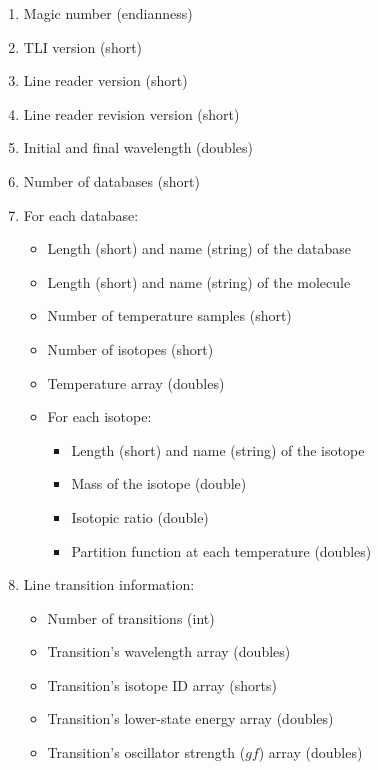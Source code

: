 \documentclass[letterpaper, 12pt]{article}
\begin{document}
\begin{enumerate}
\setlength\itemsep{0ex}
\setlength\topsep{0ex}
\setlength\partopsep{0ex}
\setlength\parsep{0ex}

\item Magic number (endianness)
\item TLI version (short)
\item Line reader version (short)
\item Line reader revision version (short)
\item Initial and final wavelength (doubles)
\item Number of databases (short)
\item For each database:

\begin{itemize}
\setlength\itemsep{0ex}
\setlength\topsep{0ex}
\setlength\partopsep{0ex}
\setlength\parsep{0ex}
\item Length (short) and name (string) of the database
\item Length (short) and name (string) of the molecule
\item Number of temperature samples (short)
\item Number of isotopes (short)
\item Temperature array (doubles)

\item For each isotope:
\begin{itemize}
\setlength\itemsep{0ex}
\setlength\topsep{0ex}
\setlength\partopsep{0ex}
\setlength\parsep{0ex}
\item Length (short) and name (string) of the isotope
\item Mass of the isotope (double)
\item Isotopic ratio (double)
\item Partition function at each temperature (doubles)
\end{itemize}

\end{itemize}

\item Line transition information:
\begin{itemize}
\setlength\itemsep{0ex}
\setlength\topsep{0ex}
\setlength\partopsep{0ex}
\setlength\parsep{0ex}
\item Number of transitions (int)
\item Transition's wavelength array (doubles)
\item Transition's isotope ID array (shorts) 
\item Transition's lower-state energy array (doubles)
\item Transition's oscillator strength ($gf$) array (doubles)
\end{itemize}
\end{enumerate}
\end{document}
